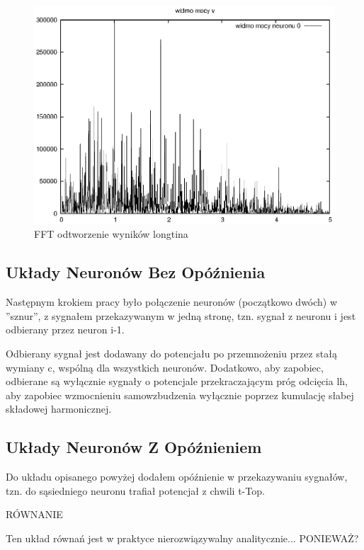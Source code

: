   \begin{figure}
    \includegraphics[width=140mm]{images/1neuron/3}
    \caption{FFT odtworzenie wyników longtina}
    \label{sym1fft}
  \end{figure}

  
  \subsection{Układy Neuronów Bez Opóźnienia}
  
  Następnym krokiem pracy było połączenie neuronów (początkowo dwóch) w ''sznur'', z sygnałem przekazywanym w jedną stronę, tzn. sygnał z neuronu i jest odbierany przez neuron i-1.
  
  Odbierany sygnał jest dodawany do potencjału po przemnożeniu przez stałą wymiany c, wspólną dla wszystkich neuronów. Dodatkowo, aby zapobiec, odbierane są wyłącznie sygnały o potencjale przekraczającym próg odcięcia lh, aby zapobiec wzmocnieniu samowzbudzenia wyłącznie poprzez kumulację słabej składowej harmonicznej.
  
  \subsection{Układy Neuronów Z Opóźnieniem}
  
  Do układu opisanego powyżej dodałem opóźnienie w przekazywaniu sygnałów, tzn. do sąsiedniego neuronu trafiał potencjał z chwili t-Top.
  
  RÓWNANIE
  
  Ten układ równań jest w praktyce nierozwiązywalny analitycznie... PONIEWAŻ?
  
